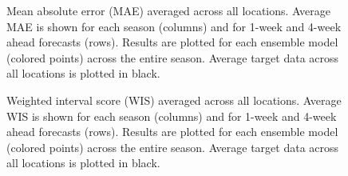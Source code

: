 \documentclass[
  article,
  shortnames,
  notitle]{jss}
\begin{document}
\begin{figure}


\caption{\label{fig-mae-vs-forecast-date}Mean absolute error (MAE)
averaged across all locations. Average MAE is shown for each season
(columns) and for 1-week and 4-week ahead forecasts (rows). Results are
plotted for each ensemble model (colored points) across the entire
season. Average target data across all locations is plotted in black.}

\end{figure}%

\begin{figure}


\caption{\label{fig-wis-vs-forecast-date}Weighted interval score (WIS)
averaged across all locations. Average WIS is shown for each season
(columns) and for 1-week and 4-week ahead forecasts (rows). Results are
plotted for each ensemble model (colored points) across the entire
season. Average target data across all locations is plotted in black.}

\end{figure}%
\end{document}
